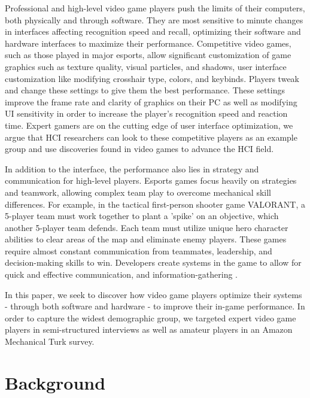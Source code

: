 \documentclass[11pt,manuscript,screen,review]{acmart} %
\begin{document}
Professional and high-level video game players push the limits of their computers, both physically and through software. They are most sensitive to minute changes in interfaces affecting recognition speed and recall, optimizing their software and hardware interfaces to maximize their performance. Competitive video games, such as those played in major esports, allow significant customization of game graphics such as texture quality, visual particles, and shadows, user interface customization like modifying crosshair type, colors, and keybinds. Players tweak and change these settings to give them the best performance. These settings improve the frame rate and clarity of graphics on their PC as well as modifying UI sensitivity in order to increase the player's recognition speed and reaction time. Expert gamers are on the cutting edge of user interface optimization, we argue that HCI researchers can look to these competitive players as an example group and use discoveries found in video games to advance the HCI field.

In addition to the interface, the performance also lies in strategy and communication for high-level players. Esports games focus heavily on strategies and teamwork, allowing complex team play to overcome mechanical skill differences. For example, in the tactical first-person shooter game VALORANT, a 5-player team must work together to plant a 'spike' on an objective, which another 5-player team defends. Each team must utilize unique hero character abilities to clear areas of the map and eliminate enemy players. These games require almost constant communication from teammates, leadership, and decision-making skills to win. Developers create systems in the game to allow for quick and effective communication, and information-gathering \cite{Alharthi2018}. 

In this paper, we seek to discover how video game players optimize their systems - through both software and hardware - to improve their in-game performance. In order to capture the widest demographic group, we targeted expert video game players in semi-structured interviews as well as amateur players in an Amazon Mechanical Turk survey. 


\section{Background} %
\end{document}

